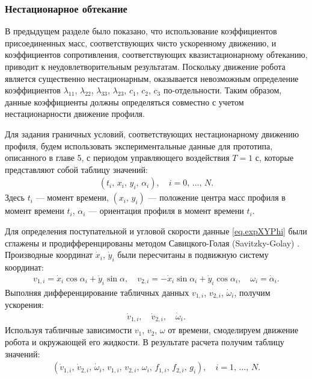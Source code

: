 \subsubsection*{Нестационарное обтекание}\label{ssec.unsteady}


В предыдущем разделе было показано, что использование коэффициентов присоединенных масс, соответствующих чисто ускоренному движению, и коэффициентов сопротивления, соответствующих квазистационарному обтеканию, приводит к неудовлетворительным результатам. Поскольку движение робота является существенно нестационарным, оказывается невозможным определение коэффициентов $\lambda_{11}$, $\lambda_{22}$, $\lambda_{33}$, $\lambda_{23}$, $c_1$, $c_2$, $c_3$ по-отдельности. Таким образом, данные коэффициенты должны определяться совместно с учетом нестационарности движение профиля.

Для задания граничных условий, соответствующих нестационарному движению профиля, будем использовать экспериментальные данные для прототипа, описанного в главе 5, с периодом управляющего воздействия $T = 1$ с, которые представляют собой таблицу значений:
\begin{gather}
	(t_i,\, x_i,\, y_i,\, \alpha_i),\quad i = 0,\, \ldots,\, N.\label{eq.expXYPhi}
\end{gather}
Здесь $t_i$ --- момент времени, $(x_i,\, y_i)$ --- положение центра масс профиля в момент времени $t_i$, $\alpha_i$ --- ориентация профиля в момент времени $t_i$.

Для определения поступательной и угловой скорости данные \eqref{eq.expXYPhi} были сглажены и продифференцированы методом Савицкого-Голая (Savitzky-Golay) \cite{Gorry_1990, Savitzky_Golay_1964}. Производные координат $\dot{x}_i$, $\dot{y}_i$ были пересчитаны в подвижную систему координат:
\begin{gather}
	v_{1,i} = \dot{x}_i \cos\alpha_i + \dot{y}_i \sin \alpha,\quad v_{2,i} = -\dot{x}_i \sin\alpha_i + \dot{y}_i \cos\alpha_i,\quad \omega_i = \dot{\alpha}_i.
\end{gather}
Выполняя дифференцирование табличных данных $v_{1,i}$, $v_{2,i}$, $\dot{\omega}_i$, получим ускорения:
\begin{gather}
	\dot{v}_{1,i},\quad \dot{v}_{2,i},\quad \dot{\omega}_i.
\end{gather}
Используя табличные зависимости $v_1$, $v_2$, $\omega$ от времени, смоделируем движение робота и окружающей его жидкости. В результате расчета получим таблицу значений:
\begin{gather}
	(\dot{v}_{1,i},\, \dot{v}_{2,i},\, \dot{\omega}_i,\, v_{1,i},\, v_{2,i},\, \omega_i,\, f_{1,i},\, f_{2,i},\, g_i),\quad i = 1,\, \ldots,\, N.
\end{gather}

